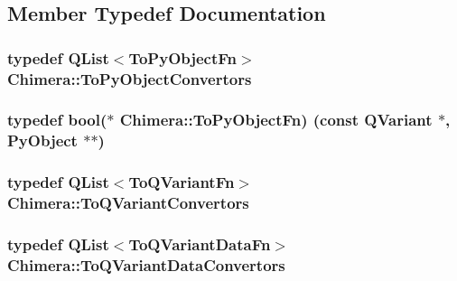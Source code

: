 \subsection{Member Typedef Documentation}
\hypertarget{classChimera_a2ee1210a664f0d28e5220b5055c8386a}{}
\subsubsection[{To\+Py\+Object\+Convertors}]{\setlength{\rightskip}{0pt plus 5cm}typedef {\bf Q\+List}$<${\bf To\+Py\+Object\+Fn}$>$ {\bf Chimera\+::\+To\+Py\+Object\+Convertors}}\label{classChimera_a2ee1210a664f0d28e5220b5055c8386a}
\hypertarget{classChimera_a056918a401ce0fb2fc5f0b46a8eb6967}{}
\subsubsection[{To\+Py\+Object\+Fn}]{\setlength{\rightskip}{0pt plus 5cm}typedef {\bf bool}($\ast$ Chimera\+::\+To\+Py\+Object\+Fn) (const Q\+Variant $\ast$, Py\+Object $\ast$$\ast$)}\label{classChimera_a056918a401ce0fb2fc5f0b46a8eb6967}
\hypertarget{classChimera_a626f5f4e5792ee128819ed589df4a004}{}
\subsubsection[{To\+Q\+Variant\+Convertors}]{\setlength{\rightskip}{0pt plus 5cm}typedef {\bf Q\+List}$<${\bf To\+Q\+Variant\+Fn}$>$ {\bf Chimera\+::\+To\+Q\+Variant\+Convertors}}\label{classChimera_a626f5f4e5792ee128819ed589df4a004}
\hypertarget{classChimera_a978cb277f1825535a81d9646adb17280}{}
\subsubsection[{To\+Q\+Variant\+Data\+Convertors}]{\setlength{\rightskip}{0pt plus 5cm}typedef {\bf Q\+List}$<${\bf To\+Q\+Variant\+Data\+Fn}$>$ {\bf Chimera\+::\+To\+Q\+Variant\+Data\+Convertors}}\label{classChimera_a978cb277f1825535a81d9646adb17280}
\hypertarget{classChimera_a5c642e88eaf111610ca6e7c946bb2f7d}{}
